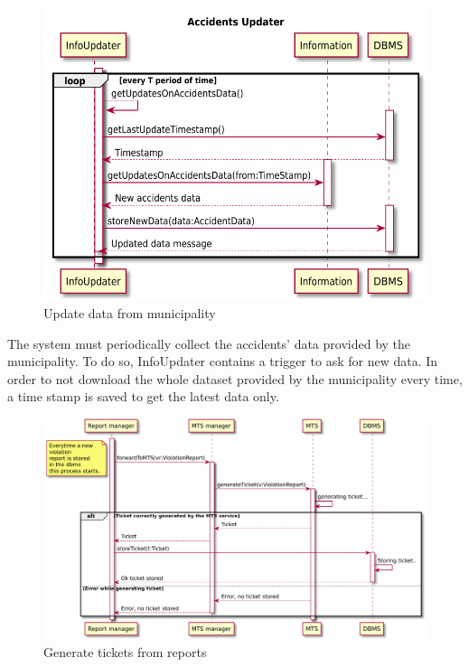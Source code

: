 \documentclass[./main.tex]{subfiles}
\begin{document}
\begin{figure}[H]
\centering
\includegraphics[width=\textwidth]{resources/sequence_diagrams/info_updater}
\caption{Update data from municipality}
\end{figure}

The system must periodically collect the accidents' data provided by the municipality. To do so, InfoUpdater contains a trigger to ask for new data. In order to not download the whole dataset provided by the municipality every time, a time stamp is saved to get the latest data only.

\begin{figure}[H]
\centering
\includegraphics[width=\textwidth]{resources/sequence_diagrams/generate_tickets}
\caption{Generate tickets from reports}
\end{figure}
\end{document}
